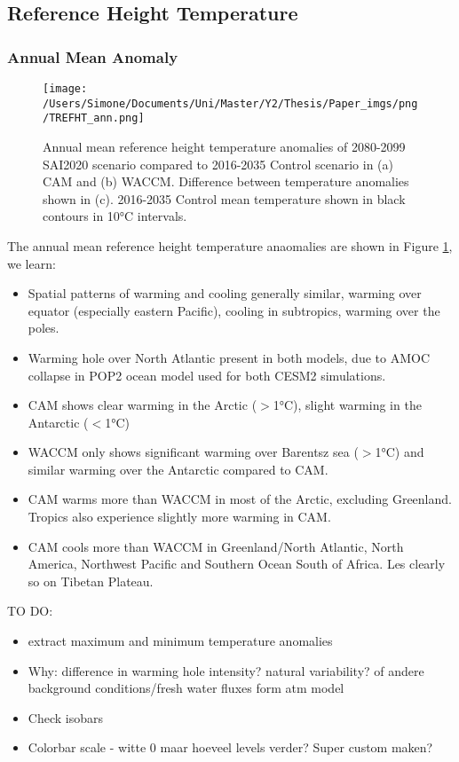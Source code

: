 \subsection{Reference Height Temperature}

\subsubsection{Annual Mean Anomaly}

\begin{figure}[H]
	\centering
	\texttt{[image: /Users/Simone/Documents/Uni/Master/Y2/Thesis/Paper\_imgs/png/TREFHT\_ann.png]}
	\caption{Annual mean reference height temperature anomalies of 2080-2099 SAI2020 scenario compared to 2016-2035 Control scenario in (a) CAM and (b) WACCM. Difference between temperature anomalies shown in (c). 2016-2035 Control mean temperature shown in black contours in 10°C intervals.}
	\label{fig:TREFHT_ann}
\end{figure}

The annual mean reference height temperature anaomalies are shown in Figure \ref{fig:TREFHT_ann}, we learn:

\begin{itemize}
	\item Spatial patterns of warming and cooling generally similar, warming over equator (especially eastern Pacific), cooling in subtropics, warming over the poles.
	\item Warming hole over North Atlantic present in both models, due to AMOC collapse in POP2 ocean model used for both CESM2 simulations. 
	\item CAM shows clear warming in the Arctic ($>$1°C), slight warming in the Antarctic ($<$1°C)
	\item WACCM only shows significant warming over Barentsz sea ($>$1°C) and similar warming over the Antarctic compared to CAM.
	\item CAM warms more than WACCM in most of the Arctic, excluding Greenland. Tropics also experience slightly more warming in CAM.
	\item CAM cools more than WACCM in Greenland/North Atlantic, North America, Northwest Pacific and Southern Ocean South of Africa. Les clearly so on Tibetan Plateau.
\end{itemize}

TO DO:
\begin{itemize}
	\item extract maximum and minimum temperature anomalies
	\item Why: difference in warming hole intensity? natural variability? of andere background conditions/fresh water fluxes form atm model
	\item Check isobars
	\item Colorbar scale - witte 0 maar hoeveel levels verder? Super custom maken?
\end{itemize}



